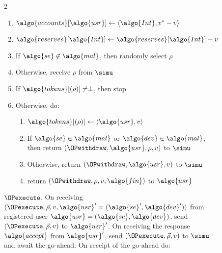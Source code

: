 \begin{figure}
\begin{minipage}{1.1\textwidth}
\begin{framed}
\begin{multicols}{2}
\begin{enumerate}
\begin{enumerate}
              \item $\algo{accounts}[\algo{usr}] \leftarrow \langle \algo{Int},
                v^* - v\rangle$

              \item $\algo{reserves}[\algo{Int}] \leftarrow
                \algo{reserves}[\algo{Int}] - v$

              \item If $\algo{se} \not\in \algo{mal}$, then randomly select
                $\rho$

              \item Otherwise, receive $\rho$ from $\simu$

              \item If $\algo{tokens}[(\rho)] \neq \perp$, then stop

              \item Otherwise, do:

                \begin{enumerate}

                  \item $\algo{tokens}[(\rho)] \gets \langle \algo{usr}, v
                    \rangle$

                  \item If $\algo{se} \in \algo{mal}$ or $\algo{dev} \in
                    \algo{mal}$, then return $(\OPwithdraw, \algo{usr},
                    \rho, v)$ to $\simu$ \item Otherwise, return
                    $(\OPwithdraw, \algo{usr}, v)$ to $\simu$

                  \item return $(\OPwithdraw, \rho, v, \algo{fin})$ to
                    $\algo{usr}$

                \end{enumerate}

            \end{enumerate}

        \end{enumerate}

        {$\OPexecute$.} On receiving $(\OPexecute, \vec{\rho}, v, \algo{usr}' =
        (\algo{se}', \algo{dev}'))$ from registered user $\algo{usr} =
        (\algo{se}, \algo{dev})$, send $(\OPexecute, \vec{\rho}, v)$ to
        $\algo{usr}'$. On receiving the response $\algo{accept}$ from
        $\algo{usr}'$, send $(\OPexecute, \vec{\rho}, v)$ to $\simu$ and await
        the go-ahead. On receipt of the go-ahead do:


\end{multicols}
\end{framed}
\end{minipage}
\end{figure}
